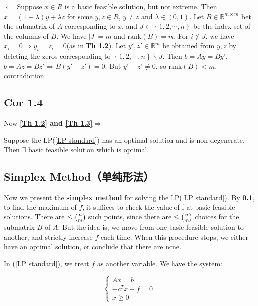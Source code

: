 \medskip $\Longleftarrow$ Suppose $x\in R$ is a basic feasible solution, but not extreme. Then $x = (1-\lambda)y+\lambda z$ for some $y, z\in R$, $y\neq z$ and $\lambda\in(0, 1)$. Let $B\in \mathbb{R}^{m\times m}$ bet the submatrix of $A$ corresponding to $x$, and $J\subset\left\lbrace 1, 2, \cdots, n\right\rbrace$ be the index set of the columns of $B$. We have $|J| = m$ and $\text{rank}(B) = m$. For $i\notin J$, we have $x_i = 0\Rightarrow y_i = z_i = 0$(as in \textbf{Th 1.2}). Let $y', z'\in \mathbb{R}^m$ be obtained from $y, z$ by deleting the zeros corresponding to $\left\lbrace 1, 2, \cdots, n\right\rbrace\backslash J$. Then $b = Ay = By'$, $b = Az = Bz'\Rightarrow$$B(y'-z')=0$. But $y'-z'\neq 0$, so $\text{rank}(B) < m$, contradiction.

\subsection{Cor 1.4}\label{Cor 1.4}
\noindent Now \textbf{\ref{Th 1.2} and \ref{Th 1.3}}$\Longrightarrow$ 
\begin{corollary}
    Suppose the LP(\ref{LP standard}) has an optimal solution and is non-degenerate. Then $\exists$ basic feasible solution which is optimal.
\end{corollary}

\subsection{Simplex Method（单纯形法）}\label{Simplex Method}
Now we present the \textbf{simplex method} for solving the LP(\ref{LP standard}). By \textbf{\ref{Cor 1.4}}, to find the maximum of $f$, it suffices to check the value of f at basic feasible solutions. There are $\le \tbinom{n}{m}$ such points, since there are $\le \tbinom{n}{m}$ choices for the submatrix $B$ of $A$. But the idea is, we move from one basic feasible solution to another, and strictly increase $f$ each time. When this procedure stops, we either have an optimal solution, or conclude that there are none.

In (\ref{LP standard}), we treat $f$ as another variable. We have the system:

\begin{equation}
    \left\lbrace\begin{array}{r}
       Ax =b  \\
       -c^Tx + f=0\\
       x \ge0
    \end{array}   \right.\nonumber
\end{equation}

